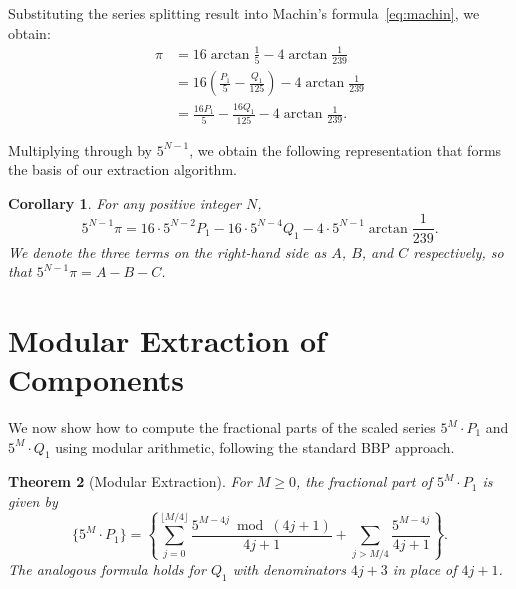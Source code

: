 \documentclass[11pt]{article}
\newtheorem{theorem}{Theorem}[section]
\newtheorem{corollary}[theorem]{Corollary}
\begin{document}
Substituting the series splitting result into Machin's formula~\eqref{eq:machin}, we obtain:
\begin{align*}
\pi &= 16 \arctan\frac{1}{5} - 4 \arctan\frac{1}{239} \\[4pt]
&= 16 \left( \frac{P_1}{5} - \frac{Q_1}{125} \right) - 4 \arctan\frac{1}{239} \\[4pt]
&= \frac{16 P_1}{5} - \frac{16 Q_1}{125} - 4 \arctan\frac{1}{239}.
\end{align*}

Multiplying through by $5^{N-1}$, we obtain the following representation that forms the basis of our extraction algorithm.

\begin{corollary}\label{cor:machin-expanded}
For any positive integer $N$,
\begin{equation}\label{eq:5N-pi}
5^{N-1}\pi = 16 \cdot 5^{N-2} P_1 - 16 \cdot 5^{N-4} Q_1 - 4 \cdot 5^{N-1} \arctan\frac{1}{239}.
\end{equation}
We denote the three terms on the right-hand side as $A$, $B$, and $C$ respectively, so that $5^{N-1}\pi = A - B - C$.
\end{corollary}

\section{Modular Extraction of Components}

We now show how to compute the fractional parts of the scaled series $5^M \cdot P_1$ and $5^M \cdot Q_1$ using modular arithmetic, following the standard BBP approach.

\begin{theorem}[Modular Extraction]\label{thm:mod-extract}
For $M \geq 0$, the fractional part of $5^M \cdot P_1$ is given by
\begin{equation}\label{eq:mod-P1}
\{5^M \cdot P_1\} = \left\{ \sum_{j=0}^{\lfloor M/4 \rfloor} \frac{5^{M-4j} \bmod (4j+1)}{4j+1} + \sum_{j > M/4} \frac{5^{M-4j}}{4j+1} \right\}.
\end{equation}
The analogous formula holds for $Q_1$ with denominators $4j+3$ in place of $4j+1$.
\end{theorem}
\end{document}
